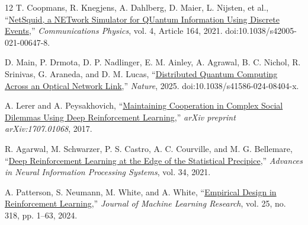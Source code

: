 \documentclass[12pt]{article}
\begin{document}
{\begin{thebibliography}{12}
T. Coopmans, R. Knegjens, A. Dahlberg, D. Maier, L. Nijsten, et al.,
``\href{https://doi.org/10.1038/s42005-021-00647-8}{NetSquid, a NETwork Simulator for QUantum Information Using Discrete Events},''
\textit{Communications Physics}, vol. 4, Article 164, 2021.
doi:10.1038/s42005-021-00647-8.

D. Main, P. Drmota, D. P. Nadlinger, E. M. Ainley, A. Agrawal, B. C. Nichol,
R. Srinivas, G. Araneda, and D. M. Lucas,
``\href{https://doi.org/10.1038/s41586-024-08404-x}{Distributed Quantum Computing Across an Optical Network Link},''
\textit{Nature}, 2025. doi:10.1038/s41586-024-08404-x.

A. Lerer and A. Peysakhovich,
``\href{https://arxiv.org/abs/1707.01068}{Maintaining Cooperation in Complex Social Dilemmas Using Deep Reinforcement Learning},''
\textit{arXiv preprint arXiv:1707.01068}, 2017.

R. Agarwal, M. Schwarzer, P. S. Castro, A. C. Courville, and M. G. Bellemare,
``\href{https://papers.nips.cc/paper/2021/hash/f514cec81cb148559cf475e7426eed5e-Abstract.html}{Deep Reinforcement Learning at the Edge of the Statistical Precipice},''
\textit{Advances in Neural Information Processing Systems}, vol. 34, 2021.

A. Patterson, S. Neumann, M. White, and A. White,
``\href{https://jmlr.org/papers/v25/23-0183.html}{Empirical Design in Reinforcement Learning},''
\textit{Journal of Machine Learning Research}, vol. 25, no. 318, pp. 1--63, 2024.

\end{thebibliography}
}
\end{document}
